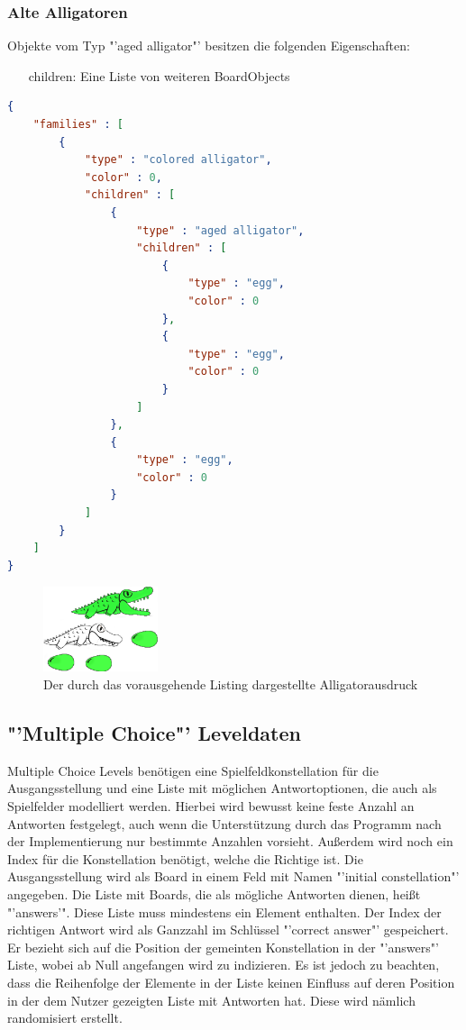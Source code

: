 \subsubsection{Alte Alligatoren}
Objekte vom Typ "'aged alligator"' besitzen die folgenden Eigenschaften:
\begin{itemize}
	\item[children:] Eine Liste von weiteren BoardObjects
\end{itemize}

\begin{lstlisting}[language=json,caption={Ein einfaches Board mit allen existierenden BoardObjects}]
{
	"families" : [
		{
			"type" : "colored alligator",
			"color" : 0,
			"children" : [
				{
					"type" : "aged alligator",
					"children" : [
						{
							"type" : "egg",
							"color" : 0
						},
						{
							"type" : "egg",
							"color" : 0
						}
					]
				},
				{
					"type" : "egg",
					"color" : 0
				}
			]
		}
	]
}
\end{lstlisting}
	
\begin{figure}[h]
	\caption{Der durch das vorausgehende Listing dargestellte Alligatorausdruck}
	\begin{center}
		\includegraphics[width=0.3\textwidth]{../assets/lx.((x x) x).png}
	\end{center}
\end{figure}

\subsection{"'Multiple Choice"' Leveldaten}
Multiple Choice Levels benötigen eine Spielfeldkonstellation für die Ausgangsstellung und eine Liste mit möglichen Antwortoptionen, die auch als Spielfelder modelliert werden.
Hierbei wird bewusst keine feste Anzahl an Antworten festgelegt, auch wenn die Unterstützung durch das Programm nach der Implementierung nur bestimmte Anzahlen vorsieht.
Außerdem wird noch ein Index für die Konstellation benötigt, welche die Richtige ist.
Die Ausgangsstellung wird als Board in einem Feld mit Namen "'initial constellation"' angegeben.
Die Liste mit Boards, die als mögliche Antworten dienen, heißt "'answers'".
Diese Liste muss mindestens ein Element enthalten.
Der Index der richtigen Antwort wird als Ganzzahl im Schlüssel "'correct answer"' gespeichert.
Er bezieht sich auf die Position der gemeinten Konstellation in der "'answers"' Liste, wobei ab Null angefangen wird zu indizieren.
Es ist jedoch zu beachten, dass die Reihenfolge der Elemente in der Liste keinen Einfluss auf deren Position in der dem Nutzer gezeigten Liste mit Antworten hat.
Diese wird nämlich randomisiert erstellt.

